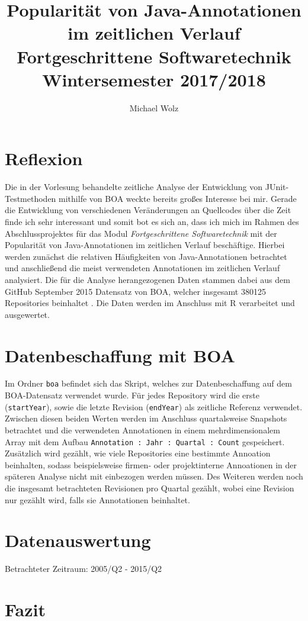 \documentclass[11pt,a4paper,pageskip=full]{scrartcl}
\author{Michael Wolz}
\title{Popularität von Java-Annotationen im zeitlichen Verlauf\\\Large{Fortgeschrittene Softwaretechnik}\\ \large{Wintersemester 2017/2018}}
\begin{document}
\maketitle


\section{Reflexion}

Die in der Vorlesung behandelte zeitliche Analyse der Entwicklung von JUnit-Testmetho\-den mithilfe von BOA weckte bereits großes Interesse bei mir. Gerade die Entwicklung von verschiedenen Veränderungen an Quellcodes über die Zeit finde ich sehr interessant und somit bot es sich an, dass ich mich im Rahmen des Abschlussprojektes für das Modul \textit{Fortgeschrittene Softwaretechnik} mit der Popularität von Java-Annotationen im zeitlichen Verlauf beschäftige. Hierbei werden zunächst die relativen Häufigkeiten von Java-Annotationen betrachtet und anschließend die meist verwendeten Annotationen im zeitlichen Verlauf analysiert. Die für die Analyse herangezogenen Daten stammen dabei aus dem GitHub September 2015 Datensatz von BOA, welcher insgesamt 380125 Repositories beinhaltet \cite{boadatasetstats}. Die Daten werden im Anschluss mit R verarbeitet und ausgewertet.

\section{Datenbeschaffung mit BOA}

Im Ordner \texttt{boa} befindet sich das Skript, welches zur Datenbeschaffung auf dem BOA-Datensatz verwendet wurde. Für jedes Repository wird die erste (\texttt{startYear}), sowie die letzte Revision (\texttt{endYear}) als zeitliche Referenz verwendet. Zwischen diesen beiden Werten werden im Anschluss quartalsweise Snapshots betrachtet und die verwendeten Annotationen in einem mehrdimensionalem Array mit dem Aufbau \texttt{Annotation : Jahr : Quartal : Count} gespeichert. Zusätzlich wird gezählt, wie viele Repositories eine bestimmte Annoation beinhalten, sodass beispielsweise firmen- oder projektinterne Annoationen in der späteren Analyse nicht mit einbezogen werden müssen. Des Weiteren werden noch die insgesamt betrachteten Revisionen pro Quartal gezählt, wobei eine Revision nur gezählt wird, falls sie Annotationen beinhaltet.  

\section{Datenauswertung}

Betrachteter Zeitraum: 2005/Q2 - 2015/Q2




\section{Fazit}

\printbibliography
\end{document}

